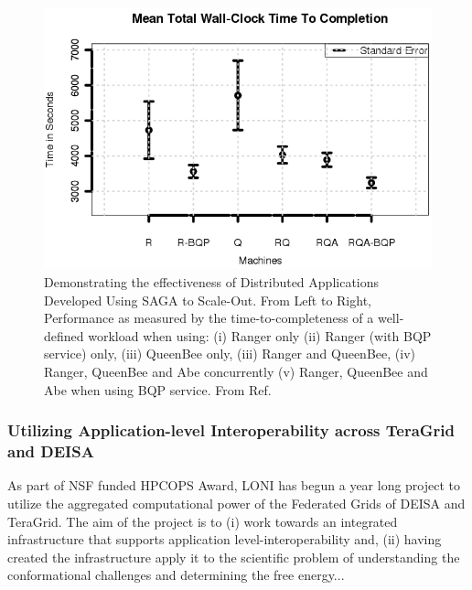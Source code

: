 \documentclass[a4paper,10pt]{article}
\begin{document}
\begin{figure}
\begin{center}
\includegraphics[scale=0.8]{Figure7.png}
\end{center}
\caption{Demonstrating the effectiveness of Distributed Applications Developed  Using SAGA to Scale-Out. From Left to Right, Performance as measured by the time-to-completeness of a well-defined workload when using: (i) Ranger only (ii) Ranger (with BQP service) only, (iii) QueenBee only, (iii) Ranger and QueenBee, (iv) Ranger, QueenBee and Abe concurrently (v) Ranger, QueenBee 
  and Abe when using BQP service. From Ref.~\cite{gmac} }
\label{fig:results}
\end{figure}

\subsubsection*{Utilizing Application-level Interoperability across TeraGrid and DEISA}
As part of NSF funded HPCOPS Award, LONI has begun a year long project to utilize the aggregated computational power of the Federated Grids of DEISA and TeraGrid. The aim of the project is to (i) work towards an integrated infrastructure that supports application level-interoperability and, (ii) having created the infrastructure apply it to the scientific problem of understanding the conformational challenges and determining the free energy...



\end{document}
